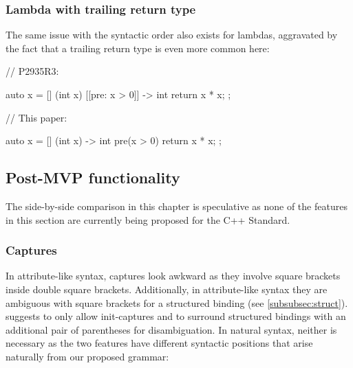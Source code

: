 \subsubsection{Lambda with trailing return type}
The same issue with the syntactic order also exists for lambdas, aggravated by the fact that a trailing return type is even more common here:


\begin{minipage}{8cm}
\begin{codeblock}
// P2935R3:

auto x = [] (int x)
  [[pre: x > 0]] -> int { 
  return x * x; 
};
\end{codeblock}
\end{minipage}
\begin{minipage}{8cm}
\begin{codeblock}
// This paper:

auto x = [] (int x) -> int 
  pre(x > 0) { 
  return x * x; 
};
\end{codeblock}
\end{minipage}

\subsection{Post-MVP functionality}

The side-by-side comparison in this chapter is speculative as none of the features in this section are currently being proposed for the C++ Standard.

\subsubsection{Captures}
\label{subsubsec:comp_captures}

In attribute-like syntax, captures look awkward as they involve square brackets inside double square brackets. Additionally, in attribute-like syntax they are ambiguous with square brackets for a structured binding (see \ref{subsubsec:struct}). \cite{P2935R3} suggests to only allow init-captures and to surround structured bindings with an additional pair of parentheses for disambiguation. In natural syntax, neither is necessary as the two features have different syntactic positions that arise naturally from our proposed grammar:

